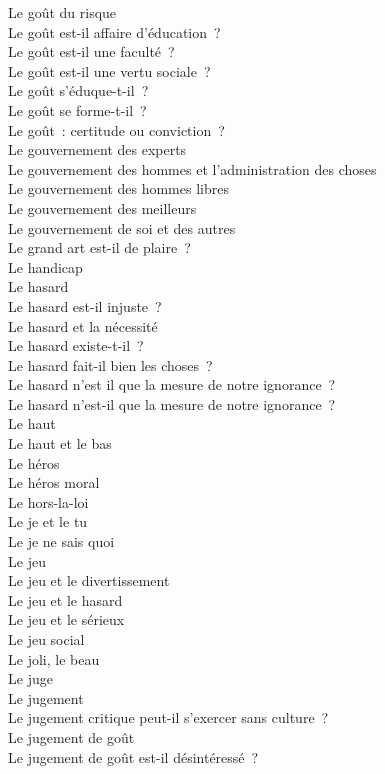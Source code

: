 \documentclass[a4paper,12pt]{article}
\begin{document}
Le goût du risque \\
Le goût est-il affaire d'éducation ? \\
Le goût est-il une faculté ? \\
Le goût est-il une vertu sociale ? \\
Le goût s'éduque-t-il ? \\
Le goût se forme-t-il ? \\
Le goût : certitude ou conviction ? \\
Le gouvernement des experts \\
Le gouvernement des hommes et l'administration des choses \\
Le gouvernement des hommes libres \\
Le gouvernement des meilleurs \\
Le gouvernement de soi et des autres \\
Le grand art est-il de plaire ? \\
Le handicap \\
Le hasard \\
Le hasard est-il injuste ? \\
Le hasard et la nécessité \\
Le hasard existe-t-il ? \\
Le hasard fait-il bien les choses ? \\
Le hasard n'est il que la mesure de notre ignorance ? \\
Le hasard n'est-il que la mesure de notre ignorance ? \\
Le haut \\
Le haut et le bas \\
Le héros \\
Le héros moral \\
Le hors-la-loi \\
Le je et le tu \\
Le je ne sais quoi \\
Le jeu \\
Le jeu et le divertissement \\
Le jeu et le hasard \\
Le jeu et le sérieux \\
Le jeu social \\
Le joli, le beau \\
Le juge \\
Le jugement \\
Le jugement critique peut-il s'exercer sans culture ? \\
Le jugement de goût \\
Le jugement de goût est-il désintéressé ? \\
\end{document}
